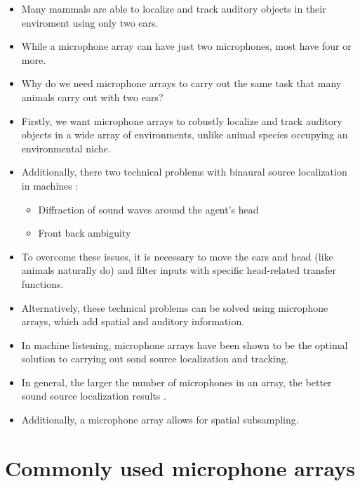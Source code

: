 \documentclass[14pt, oneside]{extarticle}
\begin{document}
\begin{itemize}

\item Many mammals are able to localize and track auditory objects in their enviroment using only two ears.

\item While a microphone array can have just two microphones, most have four or more. 

\item Why do we need microphone arrays to carry out the same task that many animals carry out with two ears?

\item Firstly, we want microphone arrays to robustly localize and track auditory objects in a wide array of environments, unlike animal species occupying an environmental niche.

\item Additionally, there two technical problems with binaural source localization in machines \cite{kim2015improved}:
	\begin{itemize}
	\item Diffraction of sound waves around the agent's head
	\item Front back ambiguity
	\end{itemize}

\item To overcome these issues, it is necessary to move the ears and head (like animals naturally do) and filter inputs with specific head-related transfer functions.

\item Alternatively, these technical problems can be solved using microphone arrays, which add spatial and auditory information. 

\item In machine listening, microphone arrays have been shown to be the optimal solution to carrying out sond source localization and tracking.

\item In general, the larger the number of microphones in an array, the better sound source localization results \cite{valin2007robust}.

\item Additionally, a microphone array allows for spatial subsampling.

\end{itemize}

\section{Commonly used microphone arrays}
\end{document}
